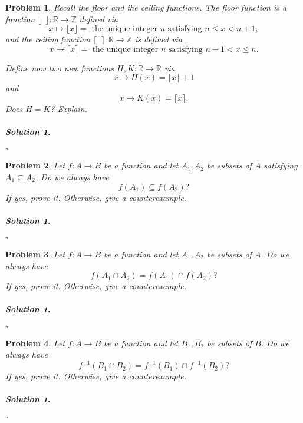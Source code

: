 \documentclass{amsart}
\theoremstyle{plain}
\newtheorem{problem}{Problem}
\newenvironment{solution}{\paragraph{\emph{Solution 1}.}}{\hfill$\square$}
\begin{document}
\begin{problem}
Recall the \emph{floor} and the \emph{ceiling} functions.  The floor function is a function $\lfloor \, \,\,\rfloor:\mathbb{R} \rightarrow \mathbb{Z}$ defined via
$$x \mapsto \lfloor x \rfloor = \text{ the unique integer } n \text{ satisfying } n \le x < n+1,$$
and the ceiling function $\lceil \, \, \, \rceil:\mathbb{R} \rightarrow \mathbb{Z}$ is defined via
$$x \mapsto \lceil x \rceil = \text{ the unique integer } n \text{ satisfying } n-1 < x \le n.$$

Define now two new functions $H, K:\mathbb{R} \rightarrow \mathbb{R}$ via
$$x \mapsto H(x) = \lfloor x \rfloor + 1 $$
and
$$x \mapsto K(x) = \lceil x \rceil. $$
Does $H = K$?  Explain.
\end{problem}
\begin{solution}
\end{solution}

\begin{problem}
Let $f:A \rightarrow B$ be a function and let $A_{1}, A_{2}$ be subsets of $A$ satisfying $A_{1} \subseteq A_{2}$.  Do we always have
$$f(A_{1}) \subseteq f(A_{2})? $$
If yes, prove it.  Otherwise, give a counterexample.
\end{problem}
\begin{solution}
\end{solution}

\begin{problem}
Let $f:A \rightarrow B$ be a function and let $A_{1}, A_{2}$ be subsets of $A$.  Do we always have
$$f(A_{1} \cap A_{2}) = f(A_{1}) \cap f(A_{2})? $$
If yes, prove it.  Otherwise, give a counterexample.
\end{problem}
\begin{solution}
\end{solution}

\begin{problem}
Let $f:A \rightarrow B$ be a function and let $B_{1}, B_{2}$ be subsets of $B$.  Do we always have
$$f^{-1}(B_{1} \cap B_{2}) = f^{-1}(B_{1}) \cap f^{-1}(B_{2})? $$
If yes, prove it.  Otherwise, give a counterexample.
\end{problem}
\begin{solution}
\end{solution}
\end{document}
